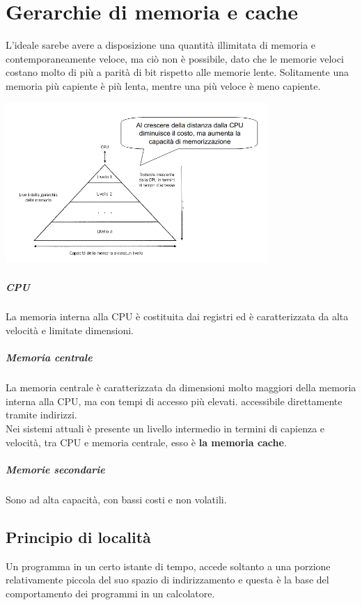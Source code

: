 \documentclass[12pt, a4paper, openany]{book}
\begin{document}
\chapter{Gerarchie di memoria e cache}
L'ideale sarebe avere a disposizione una quantità illimitata di memoria e contemporaneamente
veloce, ma ciò non è possibile, dato che le memorie veloci costano molto di più a parità
di bit rispetto alle memorie lente.
Solitamente una memoria più capiente è più lenta, mentre una più veloce è meno capiente.
\begin{center}
    \includegraphics[width=100mm, scale=0.5]{Gerarchie memorie.png}
\end{center}
\paragraph*{CPU} La memoria interna alla CPU è costituita dai registri ed è caratterizzata
da alta velocità e limitate dimensioni.
\paragraph*{Memoria centrale} La memoria centrale è caratterizzata da dimensioni molto
maggiori della memoria interna alla CPU, ma con tempi di accesso più elevati. accessibile
direttamente tramite indirizzi. 
\\ Nei sistemi attuali è presente un livello intermedio in termini di capienza e velocità,
tra CPU e memoria centrale, esso è \textbf{la memoria cache}.
\paragraph*{Memorie secondarie} Sono ad alta capacità, con bassi costi e non volatili.

\section{Principio di località}
Un programma in un certo istante di tempo, accede soltanto a una porzione relativamente
piccola del suo spazio di indirizzamento e questa è la base del comportamento dei programmi
in un calcolatore.
\end{document}
